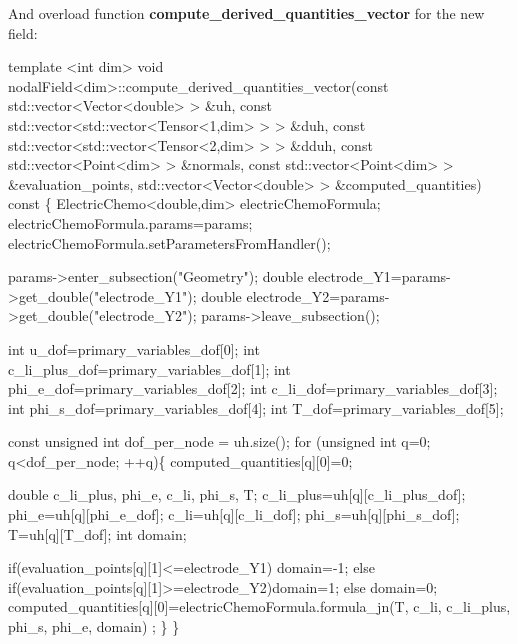  And overload function {\bfseries compute\+\_\+derived\+\_\+quantities\+\_\+vector} for the new field\+: 
\begin{DoxyCode}
\textcolor{keyword}{template} <\textcolor{keywordtype}{int} dim>
\textcolor{keywordtype}{void} nodalField<dim>::compute\_derived\_quantities\_vector(\textcolor{keyword}{const} std::vector<Vector<double> > &uh,
                           \textcolor{keyword}{const} std::vector<std::vector<Tensor<1,dim> > > &duh,
                           \textcolor{keyword}{const} std::vector<std::vector<Tensor<2,dim> > > &dduh,
                           \textcolor{keyword}{const} std::vector<Point<dim> >                  &normals,
                           \textcolor{keyword}{const} std::vector<Point<dim> >                  &evaluation\_points,
                           std::vector<Vector<double> >                    &computed\_quantities)\textcolor{keyword}{ const}
\textcolor{keyword}{}\{
    ElectricChemo<double,dim> electricChemoFormula;
    electricChemoFormula.params=params;
    electricChemoFormula.setParametersFromHandler();

    params->enter\_subsection(\textcolor{stringliteral}{"Geometry"});
    \textcolor{keywordtype}{double} electrode\_Y1=params->get\_double(\textcolor{stringliteral}{"electrode\_Y1"});
    \textcolor{keywordtype}{double} electrode\_Y2=params->get\_double(\textcolor{stringliteral}{"electrode\_Y2"});
  params->leave\_subsection();
    
    \textcolor{keywordtype}{int} u\_dof=primary\_variables\_dof[0];
    \textcolor{keywordtype}{int} c\_li\_plus\_dof=primary\_variables\_dof[1];
    \textcolor{keywordtype}{int} phi\_e\_dof=primary\_variables\_dof[2];
    \textcolor{keywordtype}{int} c\_li\_dof=primary\_variables\_dof[3];
    \textcolor{keywordtype}{int} phi\_s\_dof=primary\_variables\_dof[4];
    \textcolor{keywordtype}{int} T\_dof=primary\_variables\_dof[5];
    
    \textcolor{keyword}{const} \textcolor{keywordtype}{unsigned} \textcolor{keywordtype}{int} dof\_per\_node = uh.size();
    \textcolor{keywordflow}{for} (\textcolor{keywordtype}{unsigned} \textcolor{keywordtype}{int} q=0; q<dof\_per\_node; ++q)\{
        computed\_quantities[q][0]=0;
        
        \textcolor{keywordtype}{double} c\_li\_plus, phi\_e, c\_li, phi\_s, T;
        c\_li\_plus=uh[q][c\_li\_plus\_dof];
        phi\_e=uh[q][phi\_e\_dof];
        c\_li=uh[q][c\_li\_dof];
        phi\_s=uh[q][phi\_s\_dof];
        T=uh[q][T\_dof];
        \textcolor{keywordtype}{int} domain;
        
        \textcolor{keywordflow}{if}(evaluation\_points[q][1]<=electrode\_Y1) domain=-1;
        \textcolor{keywordflow}{else} \textcolor{keywordflow}{if}(evaluation\_points[q][1]>=electrode\_Y2)domain=1;
        \textcolor{keywordflow}{else} domain=0;
        computed\_quantities[q][0]=electricChemoFormula.formula\_jn(T, c\_li, c\_li\_plus, phi\_s, phi\_e, domain)
      ;        
    \}   
\}
\end{DoxyCode}


